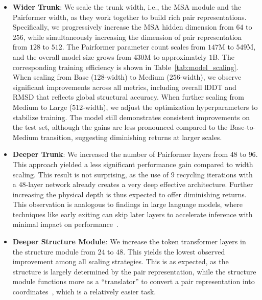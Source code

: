 \begin{itemize}
    \item \textbf{Wider Trunk}: We scale the trunk width, i.e., the MSA module and the Pairformer width, as they work together to build rich pair representations. Specifically, we progressively increase the MSA hidden dimension from $64$ to $256$, while simultaneously increasing the dimension of pair representation from $128$ to $512$. The Pairformer parameter count scales from $147$M to $549$M, and the overall model size grows from $430$M to approximately $1$B. The corresponding training efficiency is shown in Table~\ref{tab:model_scaling}. 
    When scaling from Base ($128$-width) to Medium ($256$-width), we observe significant improvements across all metrics, including overall lDDT and RMSD that reflects global structural accuracy. When further scaling from Medium to Large ($512$-width), we adjust the optimization hyperparameters to stabilize training. The model still demonstrates consistent improvements on the test set, although the gains are less pronounced compared to the Base-to-Medium transition, suggesting diminishing returns at larger scales.
    
    \item \textbf{Deeper Trunk}: We increased the number of Pairformer layers from $48$ to $96$. This approach yielded a less significant performance gain compared to width scaling. This result is not surprising, as the use of $9$ recycling iterations with a $48$-layer network already creates a very deep effective architecture. Further increasing the physical depth is thus expected to offer diminishing returns. This observation is analogous to findings in large language models, where techniques like early exiting can skip later layers to accelerate inference with minimal impact on performance~\cite{elhoushi2024layerskip}.
    
    \item \textbf{Deeper Structure Module}: We increase the token transformer layers in the structure module from $24$ to $48$. This yields the lowest observed improvement among all scaling strategies. This is as expected, as the structure is largely determined by the pair representation, while the structure module functions more as a ``translator'' to convert a pair representation into coordinates~\cite{lin2023evolutionary}, which is a relatively easier task.
\end{itemize}

